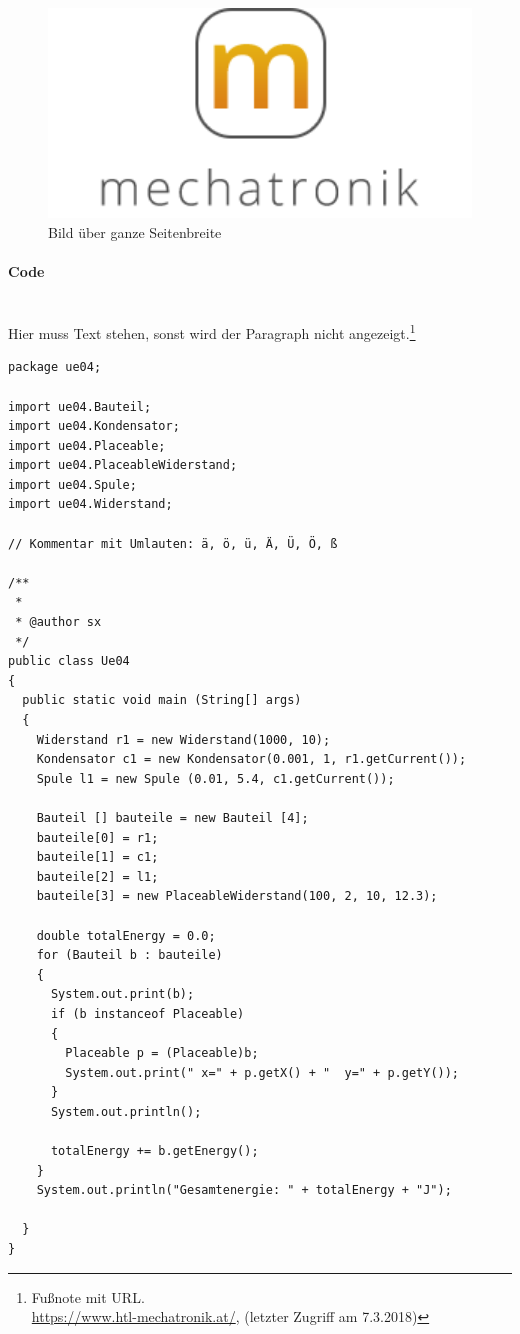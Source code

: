 \begin{figure}[H]
      \includegraphics[width=1\textwidth]{fig/logoMecha}
      \caption{Bild über ganze Seitenbreite}
      \label{Bild über ganze Seitenbreite}
\end{figure}
\newpage

\paragraph{Code}\mbox{}\\
Hier muss Text stehen, sonst wird der Paragraph nicht angezeigt.\footnote{Fußnote mit URL.\\ \url{https://www.htl-mechatronik.at/}, (letzter Zugriff am 7.3.2018)} 

\begin{lstlisting}[style=java,caption=Java Codebeispiel,label=javaCode]
package ue04;

import ue04.Bauteil;
import ue04.Kondensator;
import ue04.Placeable;
import ue04.PlaceableWiderstand;
import ue04.Spule;
import ue04.Widerstand;

// Kommentar mit Umlauten: ä, ö, ü, Ä, Ü, Ö, ß

/**
 *
 * @author sx
 */
public class Ue04
{
  public static void main (String[] args)
  {
    Widerstand r1 = new Widerstand(1000, 10);
    Kondensator c1 = new Kondensator(0.001, 1, r1.getCurrent());
    Spule l1 = new Spule (0.01, 5.4, c1.getCurrent());
    
    Bauteil [] bauteile = new Bauteil [4];
    bauteile[0] = r1;
    bauteile[1] = c1;
    bauteile[2] = l1;
    bauteile[3] = new PlaceableWiderstand(100, 2, 10, 12.3);
    
    double totalEnergy = 0.0;
    for (Bauteil b : bauteile)
    {
      System.out.print(b);
      if (b instanceof Placeable)
      {
        Placeable p = (Placeable)b;
        System.out.print(" x=" + p.getX() + "  y=" + p.getY());
      }
      System.out.println();
      
      totalEnergy += b.getEnergy();
    }
    System.out.println("Gesamtenergie: " + totalEnergy + "J");
    
  }
}

\end{lstlisting}
\newpage

